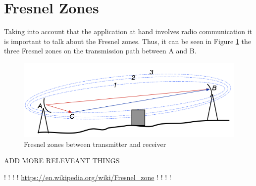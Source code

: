 \section{Fresnel Zones}\label{sec:fresnel}
Taking into account that the application at hand involves radio communication it is important to talk about the Fresnel zones. Thus, it can be seen in Figure \ref{fig:fresnel_zones} the three Fresnel zones on the transmission path between A and B. 

\begin{figure}[h]
	\centering
	\includegraphics[scale=0.65]{figures/fresnel_zones.png}
	\caption{Fresnel zones between transmitter and receiver}
	\label{fig:fresnel_zones}
\end{figure}


ADD MORE RELEVEANT THINGS 

! ! ! ! \url{https://en.wikipedia.org/wiki/Fresnel_zone}  ! ! ! !